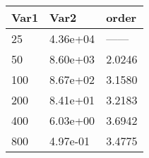 \begin{tabular}{lll}
Var1 & Var2 & order \\ 
\hline 
25 & 4.36e+04 & ------ \\ 
50 & 8.60e+03 & 2.0246 \\ 
100 & 8.67e+02 & 3.1580 \\ 
200 & 8.41e+01 & 3.2183 \\ 
400 & 6.03e+00 & 3.6942 \\ 
800 & 4.97e-01 & 3.4775 \\ 
\hline 
\end{tabular}